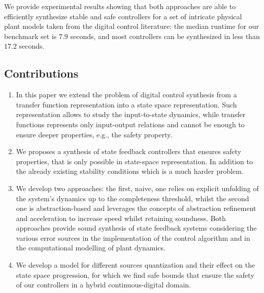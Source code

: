 \documentclass[runningheads,a4paper]{llncs}
\begin{document}

We provide experimental results 
showing that both approaches are able to efficiently synthesize stable and safe controllers 
for a set of intricate physical plant models taken from the digital 
control literature: the median runtime for our benchmark
set is $7.9$ seconds, and most controllers can be synthesized in less
than $17.2$ seconds.


\subsection*{Contributions} 

\begin{enumerate}
%
\item In this paper we extend the problem of digital control synthesis 
  from a transfer function representation into a state space representation. 
  Such representation allows to study the  input-to-state dynamics, while 
  transfer functions represents only input-output relations and cannot be 
  enough to ensure deeper properties, e.g., the safety property.
%
\item We proposes a synthesis of state feedback controllers that ensures 
  safety properties, that is only  possible in state-space representation. 
  In addition to the already existing stability conditions which is a much 
  harder problem.
%
\item We develop two approaches: the first, naive, one relies on
  explicit unfolding of the system's dynamics up to the completeness
  threshold, whilst the second one is abstraction-based and leverages
  the concepts of abstraction refinement and acceleration to increase 
  speed whilst retaining soundness. Both approaches provide sound
  synthesis of state feedback systems considering the various
  error sources in the implementation of the control algorithm and in the
  computational modelling of plant dynamics.
%
\item We develop a model for different sources quantization and their
  effect on the state space progression, for which we find safe bounds
  that ensure the safety of our controllers in a hybrid
  continuous-digital domain.
%
\end{enumerate}
\end{document}
